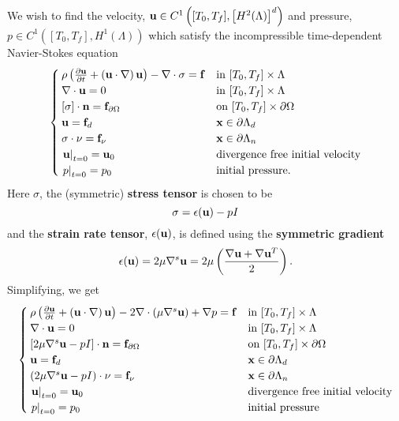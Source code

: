 \documentclass[letterpaper]{erdc}
\begin{document}
We wish to find the velocity, $\textbf{u}\in C^{1}\left([T_0,T_f], \left[H^{2}(\Lambda)\right]^d\right)$ and pressure, $p\in C^{1}\left([T_0,T_f],H^{1}(\Lambda)\right)$ which satisfy the incompressible time-dependent Navier-Stokes equation
\begin{equation}\label{eq:nspde01}
  \begin{cases}
		\rho\left(\frac{\partial \textbf{u}}{\partial t} + \left(\textbf{u}\cdot\nabla\right)\textbf{u}  \right) - \nabla\cdot \sigma = \mathbf{f} & \mbox{in }[T_0,T_f]\times\Lambda\\
		\nabla\cdot \textbf{u} = 0 & \mbox{in }[T_0,T_f]\times\Lambda\\
		\left[\sigma \right]\cdot\textbf{n} = \mathbf{f}_{\partial\Omega}  & \mbox{on }[T_0,T_f]\times\partial\Omega \\
		\textbf{u} = \mathbf{f}_d  & \textbf{x} \in\partial\Lambda_{d}\\
		\sigma\cdot\nu = \mathbf{f}_{\nu} & \textbf{x}\in \partial\Lambda_{n}\\
		\left.\textbf{u}\right|_{t=0} = \textbf{u}_{0} & \mbox{divergence free initial velocity}\\
		\left.p\right|_{t=0} = p_0 & \mbox{initial pressure.}
	\end{cases}
\end{equation}
Here $\sigma$, the (symmetric) \textbf{stress tensor} is chosen to be
\begin{equation}
	 \sigma = \epsilon(\textbf{u}) - pI
\end{equation}
and the \textbf{strain rate tensor}, $\epsilon(\textbf{u})$, is defined using the \textbf{symmetric gradient}
\begin{equation}
	\epsilon(\textbf{u}) = 2\mu \nabla^{s} \textbf{u} = 2\mu\left(\frac{\nabla\textbf{u} + \nabla\textbf{u}^{T}}{2}\right).
\end{equation}
 Simplifying, we get
\begin{equation}\label{eq:nspde02}
  \begin{cases}
		\rho\left(\frac{\partial \textbf{u}}{\partial t} + \left(\textbf{u}\cdot\nabla\right)\textbf{u}  \right) - 2\nabla\cdot\left(\mu \nabla^{s}\textbf{u} \right) + \nabla p = \mathbf{f} & \mbox{in }[T_0,T_f]\times\Lambda\\
		\nabla\cdot \textbf{u} = 0 & \mbox{in }[T_0,T_f]\times\Lambda\\
		\left[ 2\mu\nabla^{s}\textbf{u} - p I \right]\cdot\textbf{n} = \mathbf{f}_{\partial\Omega}  & \mbox{on }[T_0,T_f]\times\partial\Omega \\
		\textbf{u} = \mathbf{f}_d  & \textbf{x} \in\partial\Lambda_{d}\\
		\left(2\mu\nabla^{s}\textbf{u}-p I\right)\cdot\nu = \mathbf{f}_{\nu} & \textbf{x}\in \partial\Lambda_{n}\\
		\left.\textbf{u}\right|_{t=0} = \textbf{u}_{0} & \mbox{divergence free initial velocity} \\
		\left.p\right|_{t=0} = p_0 & \mbox{initial pressure}
	\end{cases}
\end{equation}
\end{document}
